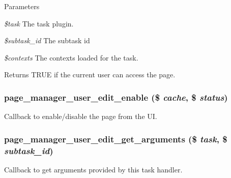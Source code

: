\begin{DoxyParams}{Parameters}
\item[{\em \$task}]The task plugin. \item[{\em \$subtask\_\-id}]The subtask id \item[{\em \$contexts}]The contexts loaded for the task. \end{DoxyParams}
\begin{DoxyReturn}{Returns}
TRUE if the current user can access the page. 
\end{DoxyReturn}
\hypertarget{page__manager_2plugins_2tasks_2user__edit_8inc_ac1cbd172da63121ed916e9923d27882a}{
\subsubsection[{page\_\-manager\_\-user\_\-edit\_\-enable}]{\setlength{\rightskip}{0pt plus 5cm}page\_\-manager\_\-user\_\-edit\_\-enable (\$ {\em cache}, \/  \$ {\em status})}}
\label{page__manager_2plugins_2tasks_2user__edit_8inc_ac1cbd172da63121ed916e9923d27882a}
Callback to enable/disable the page from the UI. \hypertarget{page__manager_2plugins_2tasks_2user__edit_8inc_a3df388f9ce4f5d83b302a54261a83e8f}{
\subsubsection[{page\_\-manager\_\-user\_\-edit\_\-get\_\-arguments}]{\setlength{\rightskip}{0pt plus 5cm}page\_\-manager\_\-user\_\-edit\_\-get\_\-arguments (\$ {\em task}, \/  \$ {\em subtask\_\-id})}}
\label{page__manager_2plugins_2tasks_2user__edit_8inc_a3df388f9ce4f5d83b302a54261a83e8f}
Callback to get arguments provided by this task handler.

